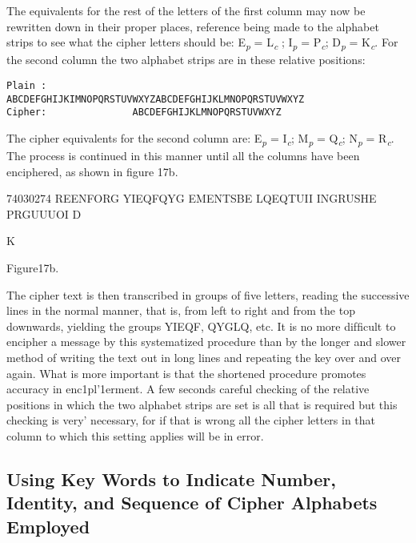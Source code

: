 The equivalents for the rest of the letters of the ﬁrst column may now
be rewritten down in their proper places, reference being made to the
alphabet strips to see what the cipher letters should be: E\textsubscript{\textit{p}} = L\textsubscript{\textit{c}} ;
I\textsubscript{\textit{p}} = P\textsubscript{\textit{c}}; D\textsubscript{\textit{p}} = K\textsubscript{\textit{c}}.
For the second column the two alphabet strips are in these relative positions:

\begin{verbatim}
Plain :
ABCDEFGHIJKIMNOPQRSTUVWXYZABCDEFGHIJKLMNOPQRSTUVWXYZ
Cipher:               ABCDEFGHIJKLMNOPQRSTUVWXYZ
\end{verbatim}

The cipher equivalents for the second column are: E\textsubscript{\textit{p}} = I\textsubscript{\textit{c}}; M\textsubscript{\textit{p}} = Q\textsubscript{\textit{c}};
N\textsubscript{\textit{p}} = R\textsubscript{\textit{c}}. The process is continued in this manner until all the columns
have been enciphered, as shown in ﬁgure 17b.


74030274
REENFORG
YIEQFQYG
EMENTSBE
LQEQTUII
INGRUSHE
PRGUUUOI
D

K

Figure17b.

The cipher text is then transcribed in groups of ﬁve letters, reading
the successive lines in the normal manner, that is, from left to right and
from the top downwards, yielding the groups YIEQF, QYGLQ, etc. It is
no more difﬁcult to encipher a message by this systematized procedure
than by the longer and slower method of writing the text out in long
lines and repeating the key over and over again. What is more important
is that the shortened procedure promotes accuracy in enc1pl'1erment. A
few seconds careful checking of the relative positions in which the two
alphabet strips are set is all that is required but this checking is very'
necessary, for if that is wrong all the cipher letters in that column to
which this setting applies will be in error.

\subsection{Using Key Words to Indicate Number, Identity, and Sequence of Cipher Alphabets Employed}

